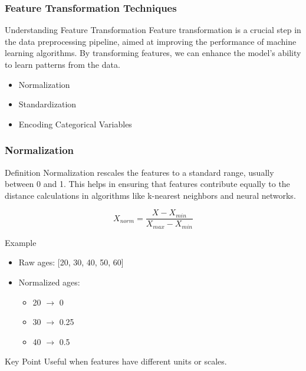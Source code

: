 \documentclass[aspectratio=169]{beamer}
\begin{document}
\begin{frame}[fragile]
    \frametitle{Feature Transformation Techniques}
    \begin{block}{Understanding Feature Transformation}
        Feature transformation is a crucial step in the data preprocessing pipeline, aimed at improving the performance of machine learning algorithms. By transforming features, we can enhance the model's ability to learn patterns from the data. 
    \end{block}
    \begin{itemize}
        \item Normalization
        \item Standardization
        \item Encoding Categorical Variables
    \end{itemize}
\end{frame}

\begin{frame}[fragile]
    \frametitle{Normalization}
    \begin{block}{Definition}
        Normalization rescales the features to a standard range, usually between 0 and 1. This helps in ensuring that features contribute equally to the distance calculations in algorithms like k-nearest neighbors and neural networks.
    \end{block}
    \begin{equation}
        X_{norm} = \frac{X - X_{min}}{X_{max} - X_{min}}
    \end{equation}
    \begin{block}{Example}
        \begin{itemize}
            \item Raw ages: [20, 30, 40, 50, 60]
            \item Normalized ages:
            \begin{itemize}
                \item 20 $\rightarrow$ 0
                \item 30 $\rightarrow$ 0.25
                \item 40 $\rightarrow$ 0.5
            \end{itemize}
        \end{itemize}
    \end{block}
    \begin{block}{Key Point}
        Useful when features have different units or scales.
    \end{block}
\end{frame}
\end{document}
